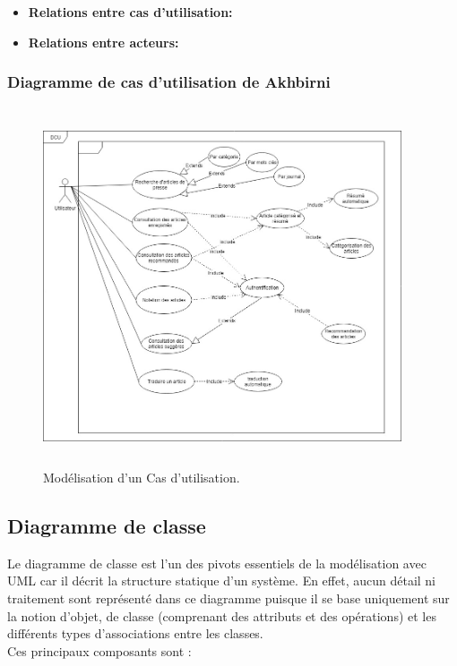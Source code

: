 \begin{itemize}
	\item \textbf{Relations entre cas d'utilisation:}

	\item \textbf{Relations entre acteurs:}
	
	
\end{itemize}

\subsubsection{Diagramme de cas d'utilisation de Akhbirni}

	\begin{figure}[H]
	\centering
	\includegraphics[height=300pt,width=300pt]{img/chapter3/Cas_d'utilisation.jpg}
	\caption{Modélisation d'un Cas d'utilisation.}
    \end{figure}

\subsection{Diagramme de classe}
Le diagramme de classe est l'un des pivots essentiels de la modélisation avec UML car il décrit la structure statique d'un système. En effet, aucun détail ni traitement sont représenté dans ce diagramme puisque il 
se base uniquement sur la notion d'objet, de classe (comprenant des attributs et des opérations) et les différents types d'associations entre les classes.\\

Ces principaux composants sont :

